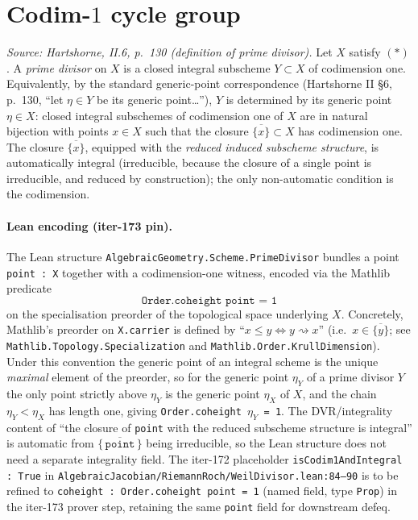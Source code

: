 \section{Codim-\(1\) cycle group}
\begin{definition}
  \label{def:prime_divisor}
  \textit{Source: Hartshorne, II.6, p.~130 (definition of prime divisor).}
  Let \(X\) satisfy \((*)\). A \emph{prime divisor} on \(X\) is a closed integral
  subscheme \(Y \subset X\) of codimension one. Equivalently, by the standard
  generic-point correspondence (Hartshorne II \S6, p.~130, ``let $\eta \in
  Y$ be its generic point\ldots''), $Y$ is determined by its generic point
  \(\eta \in X\): closed integral subschemes of codimension one of \(X\) are in
  natural bijection with points \(x \in X\) such that the closure
  \(\overline{\{x\}} \subset X\) has codimension one. The closure
  \(\overline{\{x\}}\), equipped with the \emph{reduced induced subscheme
  structure}, is automatically integral (irreducible, because the closure
  of a single point is irreducible, and reduced by construction); the only
  non-automatic condition is the codimension.
  \paragraph{Lean encoding (iter-173 pin).} The Lean structure
  \texttt{AlgebraicGeometry.Scheme.PrimeDivisor} bundles a point
  \texttt{point : X} together with a codimension-one witness, encoded via
  the Mathlib predicate
  \[
    \texttt{Order.coheight\ point\ =\ 1}
  \]
  on the specialisation preorder of the topological space underlying \(X\).
  Concretely, Mathlib's preorder on \texttt{X.carrier} is defined by
  ``\(x \leq y \iff y \rightsquigarrow x\)'' (i.e.\ \(x \in \overline{\{y\}}\);
  see \texttt{Mathlib.Topology.Specialization} and
  \texttt{Mathlib.Order.KrullDimension}). Under this convention the generic
  point of an integral scheme is the unique \emph{maximal} element of the
  preorder, so for the generic point \(\eta_Y\) of a prime divisor \(Y\) the
  only point strictly above \(\eta_Y\) is the generic point \(\eta_X\) of \(X\),
  and the chain \(\eta_Y < \eta_X\) has length one, giving
  \texttt{Order.coheight\ \(\eta_Y\)\ =\ 1}. The DVR/integrality content of
  ``the closure of \texttt{point} with the reduced subscheme structure is
  integral'' is automatic from \(\overline{\{\,\texttt{point}\,\}}\) being
  irreducible, so the Lean structure does not need a separate integrality
  field. The iter-172 placeholder \texttt{isCodim1AndIntegral : True} in
  \texttt{AlgebraicJacobian/RiemannRoch/WeilDivisor.lean:84--90} is to be
  refined to \texttt{coheight : Order.coheight point = 1} (named field, type
  \texttt{Prop}) in the iter-173 prover step, retaining the same
  \texttt{point} field for downstream defeq.

\end{definition}
